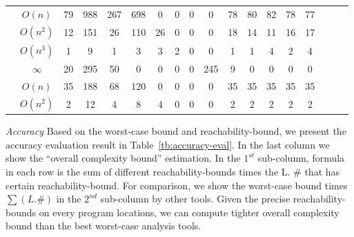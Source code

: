 \begin{table}[ht]
{\begin{tabular}{ | >{\tiny}c | >{\scriptsize}c | >{\scriptsize}c | >{\scriptsize}c | >{\scriptsize}c | c | c | c | c | c | c | c | c | c | c | c | c | c |}
    \cline{2-2}
    & $O(n)$ & 79 & 988 & 267 & 698 & 0 & 0 & 0 & 0 & 78 & 80 & 82 & 78 & 77  \\
    \cline{2-2}
    & $O(n^2)$ & 12 & 151 & 26 & 110 & 26 & 0 & 0 & 0 & 18 & 14 & 11 & 16 & 17  \\
    \cline{2-2}
    & $O(n^3)$ & 1 &  9 & 1 & 3 & 3 & 2 & 0 & 0 & 1 & 1 & 4 & 2 & 4  \\
    \cline{2-2}
    & $\infty$ & 20 & 295 &  50 & 0 & 0 & 0 & 0 & 245 & 9 & 0 & 0 & 0 & 0  \\
    \hline \hline
    \multirow{2}{*}{Tianhan} 
    & $O(n)$ & 35 & 188 & 68 & 120 & 0 & 0 & 0 & 0 & 35 & 35 & 35 & 35 & 35  \\
    \cline{2-2}
    & $O(n^2)$ & 2 & 12 & 4 & 8 & 4 & 0 & 0 & 0 & 2 & 2 & 2 & 2 & 2   \\
    \hline
    \hline
    \end{tabular}
    }
    \end{table}

\emph{Accuracy}
Based on the worst-case bound and reachability-bound, we present the accuracy evaluation result in
Table~\ref{tb:accuracy-eval}.
In the last column we show the ``overall complexity bound'' estimation.
In the $1^{st}$ sub-column, formula in each row is the sum of different reachability-bounds times the L. \# that has certain reachability-bound.
For comparison, we show the worst-case bound times $\sum(L. \#)$ in the $2^{nd}$ sub-column by other tools. Given the precise reachability-bounds on every program locations, we can compute tighter overall complexity bound than the best worst-case analysis tools.

